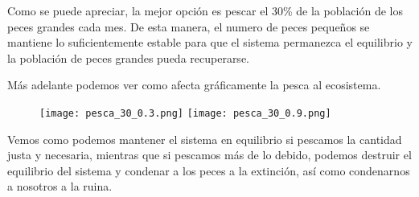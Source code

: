 Como se puede apreciar, la mejor opción es pescar el 30\% de la población de los peces grandes cada mes. De esta manera, el numero de peces pequeños se mantiene lo suficientemente estable para que el sistema permanezca el equilibrio y la población de peces grandes pueda recuperarse.

Más adelante podemos ver como afecta gráficamente la pesca al ecosistema.

\begin{figure}[h]
\texttt{[image: pesca\_30\_0.3.png]}
\texttt{[image: pesca\_30\_0.9.png]}
\centering
\end{figure}

Vemos como podemos mantener el sistema en equilibrio si pescamos la cantidad justa y necesaria, mientras que si pescamos más de lo debido, podemos destruir el equilibrio del sistema y condenar a los peces a la extinción, así como condenarnos a nosotros a la ruina.

